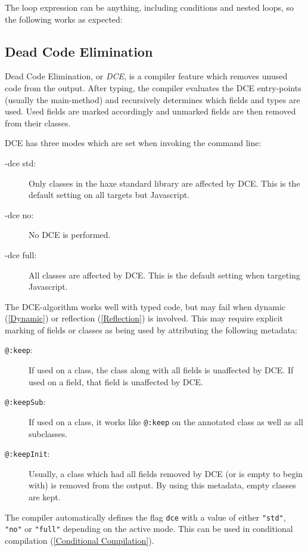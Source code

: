 \documentclass{article}
\newcommand{\target}[1]{#1}
\newcommand{\expr}[1]{\texttt{#1}}
\newcommand{\tref}[2]{#1 (\ref{#2})}
\begin{document}
The loop expression can be anything, including conditions and nested loops, so the following works as expected:






\subsection{Dead Code Elimination}
\label{Dead Code Elimination}

Dead Code Elimination, or \emph{DCE}, is a compiler feature which removes unused code from the output. After typing, the compiler evaluates the DCE entry-points (usually the main-method) and recursively determines which fields and types are used. Used fields are marked accordingly and unmarked fields are then removed from their classes.

DCE has three modes which are set when invoking the command line:

\begin{description}
	\item[-dce std:] Only classes in the haxe standard library are affected by DCE. This is the default setting on all targets but \target{Javascript}.
	\item[-dce no:] No DCE is performed.
	\item[-dce full:] All classes are affected by DCE. This is the default setting when targeting \target{Javascript}.
\end{description}
The DCE-algorithm works well with typed code, but may fail when \tref{dynamic}{Dynamic} or \tref{reflection}{Reflection} is involved. This may require explicit marking of fields or classes as being used by attributing the following metadata:

\begin{description}
	\item[\expr{@:keep}:] If used on a class, the class along with all fields is unaffected by DCE. If used on a field, that field is unaffected by DCE.
	\item[\expr{@:keepSub}:] If used on a class, it works like \expr{@:keep} on the annotated class as well as all subclasses.
	\item[\expr{@:keepInit}:] Usually, a class which had all fields removed by DCE (or is empty to begin with) is removed from the output. By using this metadata, empty classes are kept.
\end{description}
The compiler automatically defines the flag \expr{dce} with a value of either \expr{"std"}, \expr{"no"} or \expr{"full"} depending on the active mode. This can be used in \tref{conditional compilation}{Conditional Compilation}.
\end{document}

